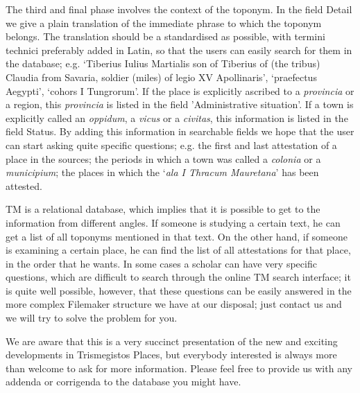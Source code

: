 \documentclass[amsthm,ebook]{saparticle}
\begin{document}
The third and final phase involves the context of the toponym. In the field Detail we give a plain translation of
the immediate phrase to which the toponym belongs. The translation should be a standardised as possible, with termini
technici preferably added in Latin, so that the users can easily search for them in the database; e.g. `Tiberius Iulius
Martialis son of Tiberius of (the tribus) Claudia from Savaria, soldier (miles) of legio XV Apollinaris', `praefectus
Aegypti', `cohors I Tungrorum'. If the place is explicitly ascribed to a \emph{provincia} or a region, this \emph{provincia} is
listed in the field 'Administrative situation'. If a town is explicitly called an \emph{oppidum}, a \emph{vicus} or a \emph{civitas}, this
information is listed in the field Status. By adding this information in searchable fields we hope that the user can
start asking quite specific questions; e.g. the first and last attestation of a place in the sources; the periods in
which a town was called a \emph{colonia} or a \emph{municipium}; the places in which the `\emph{ala I Thracum Mauretana}' has been attested.

 TM is a relational database, which implies that it is possible to get to the information from different angles. If
someone is studying a certain text, he can get a list of all toponyms mentioned in that text. On the other hand, if
someone is examining a certain place, he can find the list of all attestations for that place, in the order that he
wants. In some cases a scholar can have very specific questions, which are difficult to search through the online TM
search interface; it is quite well possible, however, that these questions can be easily answered in the more complex
Filemaker structure we have at our disposal; just contact us and we will try to solve the problem for you.

We are aware that this is a very succinct presentation of the new and exciting developments in Trismegistos Places,
but everybody interested is always more than welcome to ask for more information. Please feel free to provide us with
any addenda or corrigenda to the database you might have.



\end{document}
